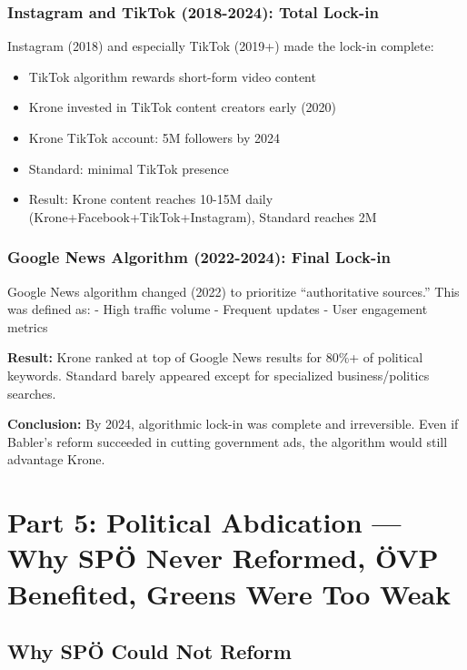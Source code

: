 {\subsubsection*{Instagram and TikTok (2018-2024): Total Lock-in}

Instagram (2018) and especially TikTok (2019+) made the lock-in complete:

\begin{itemize}
\item TikTok algorithm rewards short-form video content
\item Krone invested in TikTok content creators early (2020)
\item Krone TikTok account: 5M followers by 2024
\item Standard: minimal TikTok presence
\item Result: Krone content reaches 10-15M daily (Krone+Facebook+TikTok+Instagram), Standard reaches 2M
\end{itemize}

\subsubsection*{Google News Algorithm (2022-2024): Final Lock-in}

Google News algorithm changed (2022) to prioritize ``authoritative sources.'' This was defined as:
- High traffic volume
- Frequent updates
- User engagement metrics

\textbf{Result:} Krone ranked at top of Google News results for 80\%+ of political keywords.
Standard barely appeared except for specialized business/politics searches.

\textbf{Conclusion:} By 2024, algorithmic lock-in was complete and irreversible. Even if Babler's
reform succeeded in cutting government ads, the algorithm would still advantage Krone.


\section*{Part 5: Political Abdication --- Why SPÖ Never Reformed, ÖVP Benefited, Greens Were Too Weak}

\subsection*{Why SPÖ Could Not Reform}

}
